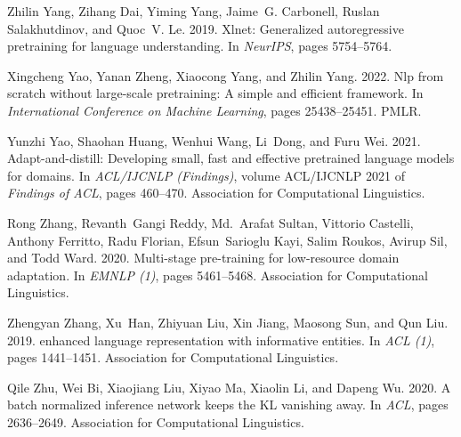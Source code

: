 \documentclass[11pt]{article}
\begin{document}
\begin{thebibliography}{59}
Zhilin Yang, Zihang Dai, Yiming Yang, Jaime~G. Carbonell, Ruslan Salakhutdinov,
  and Quoc~V. Le. 2019.
\newblock Xlnet: Generalized autoregressive pretraining for language
  understanding.
\newblock In \emph{NeurIPS}, pages 5754--5764.

Xingcheng Yao, Yanan Zheng, Xiaocong Yang, and Zhilin Yang. 2022.
\newblock Nlp from scratch without large-scale pretraining: A simple and
  efficient framework.
\newblock In \emph{International Conference on Machine Learning}, pages
  25438--25451. PMLR.

Yunzhi Yao, Shaohan Huang, Wenhui Wang, Li~Dong, and Furu Wei. 2021.
\newblock Adapt-and-distill: Developing small, fast and effective pretrained
  language models for domains.
\newblock In \emph{{ACL/IJCNLP} (Findings)}, volume {ACL/IJCNLP} 2021 of
  \emph{Findings of {ACL}}, pages 460--470. Association for Computational
  Linguistics.

Rong Zhang, Revanth~Gangi Reddy, Md.~Arafat Sultan, Vittorio Castelli, Anthony
  Ferritto, Radu Florian, Efsun~Sarioglu Kayi, Salim Roukos, Avirup Sil, and
  Todd Ward. 2020.
\newblock Multi-stage pre-training for low-resource domain adaptation.
\newblock In \emph{{EMNLP} {(1)}}, pages 5461--5468. Association for
  Computational Linguistics.

Zhengyan Zhang, Xu~Han, Zhiyuan Liu, Xin Jiang, Maosong Sun, and Qun Liu. 2019.
 enhanced language representation with informative entities.
\newblock In \emph{{ACL} {(1)}}, pages 1441--1451. Association for
  Computational Linguistics.

Qile Zhu, Wei Bi, Xiaojiang Liu, Xiyao Ma, Xiaolin Li, and Dapeng Wu. 2020.
\newblock A batch normalized inference network keeps the {KL} vanishing away.
\newblock In \emph{{ACL}}, pages 2636--2649. Association for Computational
  Linguistics.

\end{thebibliography}
\end{document}
